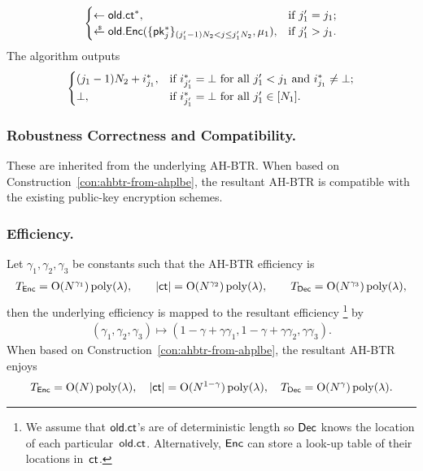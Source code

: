 \begin{construction}
\begin{itemize}
\begin{align*}
\begin{cases}
\gets\OLD.\ct^\ast,&\textup{if }j_1'=j_1;\\
\draws\OLD.\Enc(\{\pk^\ast_j\}_{(j_1'-1)N_2<j\leq j_1'N_2},\mu_1),&
\textup{if }j_1'>j_1.
\end{cases}
\end{align*}
The algorithm outputs
\begin{align*}
\begin{cases}
(j_1-1)N_2+i^\ast_{j_1},&\textup{if }
i^\ast_{j_1'}=\bot\textup{ for all }j_1'<j_1
\textup{ and }
i^\ast_{j_1}\neq\bot;\\
\bot,&\textup{if }i^\ast_{j_1'}=\bot\textup{ for all }j_1'\in[N_1].
\end{cases}
\end{align*}
\end{itemize}
\end{construction}

\subsubsection{Robustness Correctness and Compatibility.}
These are inherited from the underlying AH-BTR.
When based on Construction~\ref{con:ahbtr-from-ahplbe},
the resultant AH-BTR is compatible with the existing public-key encryption schemes.

\subsubsection{Efficiency.}
Let $\gamma_1,\gamma_2,\gamma_3$ be constants such that the AH-BTR efficiency is
\begin{align*}
T_\Enc=\bigO(N^{\gamma_1})\poly(\lambda),\qquad
|\ct|=\bigO(N^{\gamma_2})\poly(\lambda),\qquad
T_\Dec=\bigO(N^{\gamma_3})\poly(\lambda),
\end{align*}
then the underlying efficiency is mapped to the resultant efficiency%
\footnote{We assume that $\OLD.\ct$'s are of deterministic length
so $\Dec$ knows the location of each particular~$\OLD.\ct$.
Alternatively, $\Enc$ can store a look-up table of their locations in~$\ct$.}
by
\begin{align*}
(\gamma_1,\gamma_2,\gamma_3)\mapsto
(1-\gamma+\gamma\gamma_1,1-\gamma+\gamma\gamma_2,\gamma\gamma_3).
\end{align*}
When based on Construction~\ref{con:ahbtr-from-ahplbe},
the resultant AH-BTR enjoys
\begin{align*}
T_\Enc=\bigO(N)\poly(\lambda),\quad
|\ct|=\bigO(N^{1-\gamma})\poly(\lambda),\quad
T_\Dec=\bigO(N^\gamma)\poly(\lambda).
\end{align*}
